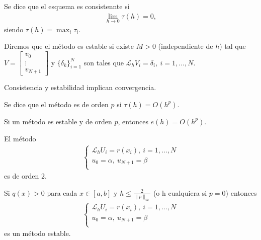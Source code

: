 \begin{defi}
Se dice que el esquema es consistennte si
\begin{align*}
    \lim_{h \to 0} \tau(h) = 0,
\end{align*}
siendo $\tau(h) = \max_{i} \tau_i$.
\end{defi}

\begin{defi}
Diremos que el método es estable si existe $M > 0$ (independiente de $h$) tal que $V = \begin{bmatrix}
v_0 \\
\vdots\\
v_{N+1}
\end{bmatrix}$ y $\{\delta_k\}_{i=1}^{N}$ son tales que $\mathcal{L}_hV_i = \delta_i, \ i = 1,\ldots,N$.
\end{defi}

\begin{teo}
Consistencia y estabilidad implican convergencia.
\end{teo}

\begin{defi}
Se dice que el método es de orden $p$ si $\tau(h) = O(h^p)$.
\end{defi}

\begin{teo}
Si un método es estable y de orden $p$, entonces $e(h) = O(h^p)$.
\end{teo}

\begin{cor}
El método
\begin{align*}
    \left\{ \begin{array}{lcc}
             \mathcal{L}_hU_i = r(x_i), \ i = 1,\ldots,N\\
             u_0 = \alpha, \ u_{N+1} = \beta\\
             \end{array}
   \right.
\end{align*}
es de orden 2.
\end{cor}

\begin{teo}
Si $q(x) > 0$ para cada $x \in [a,b]$ y $h \leq \frac{2}{\|p\|_{\infty}}$ (o h cualquiera si $p = 0$) entonces
\begin{align*}
    \left\{ \begin{array}{lcc}
             \mathcal{L}_hU_i = r(x_i), \ i = 1,\ldots,N\\
             u_0 = \alpha, \ u_{N+1} = \beta\\
             \end{array}
   \right.
\end{align*}
es un método estable.
\end{teo}

